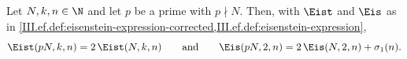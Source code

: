 Let $N,k,n\in\N$ and let $p$ be a prime with $p\nmid N$. Then, with $\Eist$ and $\Eis$ as in
\cref{III.ef.def:eisenstein-expression-corrected,III.ef.def:eisenstein-expression},
\[
  \Eist(pN,k,n)=2\,\Eist(N,k,n)\qquad\text{and}\qquad\Eis(pN,2,n)=2\,\Eis(N,2,n)+\sigma_1(n).
\]
